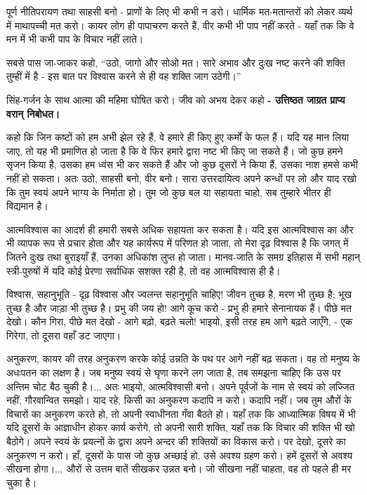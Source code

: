 \vskip 1.7pt

पूर्ण नीतिपरायण तथा साहसी बनो - प्राणों के लिए भी कभी न डरो। धार्मिक मत-मतान्तरों को लेकर व्यर्थ में माथापच्ची मत करो। कायर लोग ही पापाचरण करते हैं, वीर कभी भी पाप नहीं करते - यहाँ तक कि वे मन में भी कभी पाप के विचार नहीं लाते। 

\vskip 1.7pt

सबसे पास जा-जाकर कहो, “उठो, जागो और सोओ मत। सारे अभाव और दुःख नष्ट करने की शक्ति तुम्हीं में है - इस बात पर विश्वास करने से ही वह शक्ति जाग उठेगी।” 

\vskip 1.7pt

सिंह-गर्जन के साथ आत्मा की महिमा घोषित करो। जीव को अभय देकर कहो \textbf{- उत्तिष्ठत जाग्रत प्राप्य वरान् निबोधत। } 

कहो कि जिन कष्टों को हम अभी झेल रहे हैं, वे हमारे ही किए हुए कर्मों के फल हैं। यदि यह मान लिया जाए, तो यह भी प्रमाणित हो जाता है कि वे फिर हमारे द्वारा नष्ट भी किए जा सकते हैं। जो कुछ हमने सृजन किया है, उसका हम ध्वंस भी कर सकते हैं और जो कुछ दूसरों ने किया हैं, उसका नाश हमसे कभी नहीं हो सकता। अतः उठो, साहसी बनो, वीर बनो। सारा उत्तरदायित्व अपने कन्धों पर लो और याद रखो कि तुम स्वयं अपने भाग्य के निर्माता हो। तुम जो कुछ बल या सहायता चाहो, सब तुम्हारे भीतर ही विद्यमान है। 

आत्मविश्वास का आदर्श ही हमारी सबसे अधिक सहायता कर सकता है। यदि इस आत्म\-विश्वास का और भी व्यापक रूप से प्रचार होता और यह कार्यरूप में परिणत हो जाता, तो मेरा दृढ़ विश्वास है कि जगत् में जितने दुःख तथा बुराइयाँ हैं, उनका अधिकांश लुप्त हो जाता। मानव-जाति के समग्र इतिहास में सभी महान् स्त्री-पुरुषों में यदि कोई प्रेरणा सर्वाधिक सशक्त रही है, तो वह आत्मविश्वास ही है। 

विश्वास, सहानुभूति - दृढ़ विश्वास और ज्वलन्त सहानुभूति चाहिए! जीवन तुच्छ है, मरण भी तुच्छ है; भूख तुच्छ है और जाड़ा भी तुच्छ है। प्रभु की जय हो! आगे कूच करो - प्रभु ही हमारे सेनानायक हैं। पीछे मत देखो। कौन गिरा, पीछे मत देखो - आगे बढ़ो, बढ़ते चलो! भाइयो, इसी तरह हम आगे बढ़ते जाएँगे, - एक गिरेगा, तो दूसरा वहाँ डट जाएगा। 

अनुकरण, कायर की तरह अनुकरण करके कोई उन्नति के पथ पर आगे नहीं बढ़ सकता। वह तो मनुष्य के अधःपतन का लक्षण है। जब मनुष्य स्वयं से घृणा करने लग जाता है, तब समझना चाहिए कि उस पर अन्तिम चोट बैठ चुकी है।... अतः भाइयो, आत्मविश्वासी बनो। अपने पूर्वजों के नाम से स्वयं को लज्जित नहीं, गौरवान्वित समझो। याद रहे, किसी का अनुकरण कदापि न करो। कदापि नहीं। जब तुम औरों के विचारों का अनुकरण करते हो, तो अपनी स्वाधीनता गँवा बैठते हो। यहाँ तक कि आध्यात्मिक विषय में भी यदि दूसरों के आज्ञाधीन होकर कार्य करोगे, तो अपनी सारी शक्ति, यहाँ तक कि विचार की शक्ति भी खो बैठोगे। अपने स्वयं के प्रयत्नों के द्वारा अपने अन्दर की शक्तियों का विकास करो। पर देखो, दूसरे का अनुकरण न करो। हाँ, दूसरों के पास जो कुछ अच्छाई हो, उसे अवश्य ग्रहण करो। हमें दूसरों से अवश्य सीखना होगा।... औरों से उत्तम बातें सीखकर उन्नत बनो। जो सीखना नहीं चाहता, वह तो पहले ही मर चुका है। 

